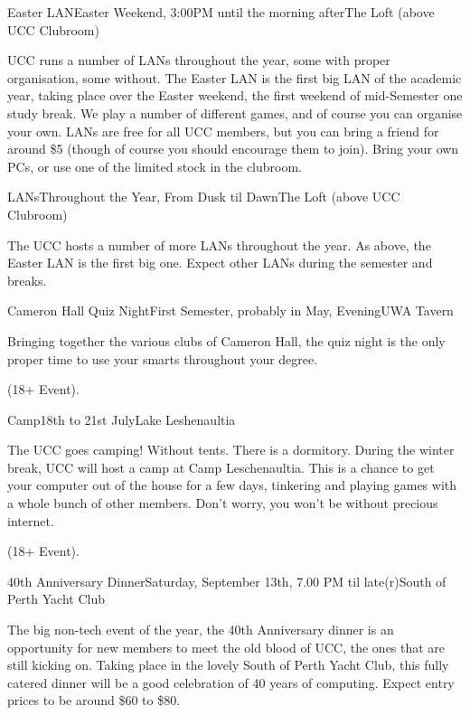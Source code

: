 \begin{event}{Easter LAN}{Easter Weekend, 3:00PM until the morning after}{The Loft (above UCC Clubroom)}

UCC runs a number of LANs throughout the year, some with proper organisation, some without. The Easter LAN is the first big LAN of the academic year, taking place over the Easter weekend, the first weekend of mid-Semester one study break. We play a number of different games, and of course you can organise your own. LANs are free for all UCC members, but you can bring a friend for around \$5 (though of course you should encourage them to join). Bring your own PCs, or use one of the limited stock in the clubroom.

\end{event}


\begin{event}{LANs}{Throughout the Year, From Dusk til Dawn}{The Loft (above UCC Clubroom)}

The UCC hosts a number of more LANs throughout the year. As above, the Easter LAN is the first big one. Expect other LANs during the semester and breaks.

\end{event}

\begin{event}{Cameron Hall Quiz Night}{First Semester, probably in May, Evening}{UWA Tavern}

Bringing together the various clubs of Cameron Hall, the quiz night is the only proper time to use your smarts throughout your degree.

 (18+ Event).

\end{event}


\begin{event}{Camp}{18th to 21st July}{Lake Leshenaultia}

The UCC goes camping! Without tents. There is a dormitory. During the winter break, UCC will host a camp at Camp Leschenaultia. This is a chance to get your computer out of the house for a few days, tinkering and playing games with a whole bunch of other members. Don't worry, you won't be without precious internet.

 (18+ Event).

\end{event}
\pagebreak


\begin{event}{40th Anniversary Dinner}{Saturday, September 13th, 7.00 PM til late(r)}{South of Perth Yacht Club}

The big non-tech event of the year, the 40th Anniversary dinner is an opportunity for new members to meet the old blood of UCC, the ones that are still kicking on. Taking place in the lovely South of Perth Yacht Club, this fully catered dinner will be a good celebration of 40 years of computing. Expect entry prices to be around \$60 to \$80.

\end{event}

